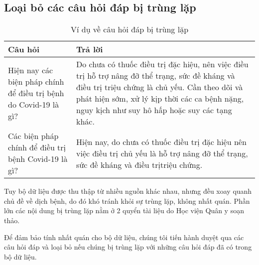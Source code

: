 \documentclass[runningheads]{llncs}
\begin{document}
\subsection{Loại bỏ các câu hỏi đáp bị trùng lặp}
\vspace{-0.4cm}
\begin{table}
	\setlength{\tabcolsep}{0.5em}
	\renewcommand{\arraystretch}{1.4}
	\begin{center}
	\caption{Ví dụ về câu hỏi đáp bị trùng lặp}\label{tab2}
		\begin{tabular}{ | p{5.75cm} | p{5.75cm} |} 
			\hline
    		\textbf{Câu hỏi} & \textbf{Trả lời}\\ 
			\hline
			Hiện nay các biện pháp chính để điều trị bệnh do Covid-19
			là gì?& Do chưa có thuốc điều trị đặc hiệu, nên việc điều trị hỗ trợ
			nâng đỡ thể trạng, sức đề kháng và điều trị triệu chứng là chủ
			yếu. Cần theo dõi và phát hiện sớm, xử lý kịp thời các ca
			bệnh nặng, nguy kịch như suy hô hấp hoặc suy các tạng khác.\\ 
			\hline
			Các biện pháp chính để điều trị bệnh Covid-19 là gì?& Hiện nay, do chưa có thuốc điều trị đặc hiệu nên việc điều trị chủ yếu là hỗ trợ nâng đỡ thể trạng, sức đề kháng và điều trịtriệu chứng.\\
			\hline
			\end{tabular}
		\end{center}
\end{table}
\vspace{-0.8cm}
Tuy bộ dữ liệu được thu thập từ nhiều nguồn khác nhau, nhưng đều xoay quanh chủ đề về dịch bệnh,
 do đó khó tránh khỏi sự trùng lặp, không nhất quán. Phần lớn các nội dung bị trùng lặp nằm ở 2 quyển tài liệu do Học viện Quân y soạn thảo.

Để đảm bảo tính nhất quán cho bộ dữ liệu, chúng tôi tiến hành duyệt qua các câu hỏi đáp và loại bỏ nếu chúng bị trùng lặp với những câu hỏi đáp đã có trong bộ dữ liệu.
\end{document}
